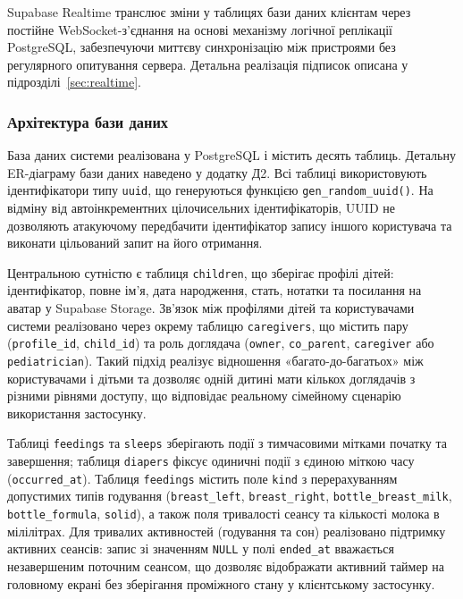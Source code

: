 Supabase Realtime транслює зміни у таблицях бази даних клієнтам через постійне WebSocket-з'єднання на основі механізму логічної реплікації PostgreSQL, забезпечуючи миттєву синхронізацію між пристроями без регулярного опитування сервера. Детальна реалізація підписок описана у підрозділі~\ref{sec:realtime}.

\subsubsection{Архітектура бази даних}

База даних системи реалізована у PostgreSQL і містить десять таблиць. Детальну \gls{ER}-діаграму бази даних наведено у додатку Д2. Всі таблиці використовують ідентифікатори типу \texttt{uuid}, що генеруються функцією \texttt{gen\_random\_uuid()}. На відміну від автоінкрементних цілочисельних ідентифікаторів, UUID не дозволяють атакуючому передбачити ідентифікатор запису іншого користувача та виконати цільований запит на його отримання.

Центральною сутністю є таблиця \texttt{children}, що зберігає профілі дітей: ідентифікатор, повне ім'я, дата народження, стать, нотатки та посилання на аватар у Supabase Storage. Зв'язок між профілями дітей та користувачами системи реалізовано через окрему таблицю \texttt{caregivers}, що містить пару (\texttt{profile\_id}, \texttt{child\_id}) та роль доглядача (\texttt{owner}, \texttt{co\_parent}, \texttt{caregiver} або \texttt{pediatrician}). Такий підхід реалізує відношення «багато-до-багатьох» між користувачами і дітьми та дозволяє одній дитині мати кількох доглядачів з різними рівнями доступу, що відповідає реальному сімейному сценарію використання застосунку.

Таблиці \texttt{feedings} та \texttt{sleeps} зберігають події з тимчасовими мітками початку та завершення; таблиця \texttt{diapers} фіксує одиничні події з єдиною міткою часу (\texttt{occurred\_at}). Таблиця \texttt{feedings} містить поле \texttt{kind} з перерахуванням допустимих типів годування (\texttt{breast\_left}, \texttt{breast\_right}, \texttt{bottle\_breast\_milk}, \texttt{bottle\_formula}, \texttt{solid}), а також поля тривалості сеансу та кількості молока в мілілітрах. Для тривалих активностей (годування та сон) реалізовано підтримку активних сеансів: запис зі значенням \texttt{NULL} у полі \texttt{ended\_at} вважається незавершеним поточним сеансом, що дозволяє відображати активний таймер на головному екрані без зберігання проміжного стану у клієнтському застосунку.

